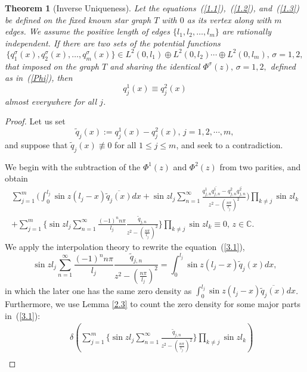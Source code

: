 \documentclass[10pt,a4paper]{article}
\theoremstyle{plain}
\newtheorem{theorem}{Theorem}[section]
\theoremstyle{definition}
\theoremstyle{remark}
\numberwithin{equation}{section}
\begin{document}
\begin{theorem}[Inverse Uniqueness]\label{T3.2}
Let the equations~(\ref{1.1}),~(\ref{1.2}), and~(\ref{1.3}) be defined on the fixed known star graph 
$T$ with $0$ as its vertex along with $m$ edges. We assume the positive length of edges $\{l_{1},l_{2},\ldots,l_{m}\}$ are rationally independent. If there are two sets of the potential functions $$\{q_{1}^{\sigma}(x),q_{2}^{\sigma}(x),\ldots,q_{m}^{\sigma}(x)\}\in L^{2}(0,l_{1})\oplus L^{2}(0,l_{2})\cdots\oplus L^{2}(0,l_{m}),\,\sigma=1,2,$$ that imposed on the graph $T$ and sharing the identical $\Phi^{\sigma}(z),\,\sigma=1,2,$ defined as in~(\ref{Phi}), then $$q_{j}^{1}(x)\equiv q_{j}^{2}(x)$$ almost everywhere for all $j$.
\end{theorem}
\begin{proof}
Let us set $$\widetilde{q}_{j}(x):=q_{j}^{1}(x)-q_{j}^{2}(x),\,j=1,2,\cdots,m,$$
and suppose that $\widetilde{q}_{j}(x)\not\equiv 0$ for all $1\leq j\leq m$, and seek to a contradiction.
\par %
We begin with the subtraction of the $\Phi^{1}(z)$ and $\Phi^{2}(z)$ from two parities, and obtain
\begin{eqnarray}\nonumber
\sum_{j=1}^{m}\Big(\int_{0}^{l_{j}}\sin{z(l_{j}-x)}\overline{\widetilde{q}_{j}(x)}dx+\sin{z l_{j}}\sum_{n=1}^{\infty}\frac{q^{1}_{j,n}\overline{q^{1}_{j,n}}-q^{2}_{j,n}\overline{q^{2}_{j,n}}}{z^{2}-(\frac{n\pi}{l_{j}})^{2}}\Big)\prod_{k\neq j}\sin{z l_{k}}\\
+\sum_{j=1}^{m}\Big\{\sin{z l_{j}}\sum_{n=1}^{\infty}\frac{(-1)^{n}n\pi}{l_{j}}\frac{\widetilde{q}_{j,n}}{z^{2}-(\frac{n\pi}{l_{j}})^{2}}\Big\}\prod_{k\neq j}\sin{z l_{k}}\equiv0,\,z\in\mathbb{C}.\label{3.1}
\end{eqnarray}
We apply the interpolation theory \cite[p.\,150,\,151]{Levin2} to rewrite the equation~(\ref{3.1}), 
\begin{equation}
\sin{z l_{j}}\sum_{n=1}^{\infty}\frac{(-1)^{n}n\pi}{l_{j}}\frac{\widetilde{q}_{j,n}}{z^{2}-(\frac{n\pi}{l_{j}})^{2}}=\int_{0}^{l_{j}}\sin{z(l_{j}-x)}\widetilde{q}_{j}(x)dx,
\end{equation}%
in which the later one has the same zero density as 
$\int_{0}^{l_{j}}\sin{z(l_{j}-x)}\overline{\widetilde{q}_{j}(x)}dx$.
Furthermore, we use Lemma \ref{2.3} to count the zero density for some major parts in~(\ref{3.1}):
\begin{eqnarray}\nonumber
&&\delta(\sum_{j=1}^{m}\Big\{\sin{z l_{j}}\sum_{n=1}^{\infty}\frac{\widetilde{q}_{j,n}}{z^{2}-(\frac{n\pi}{l_{j}})^{2}}\Big\}\prod_{k\neq j}\sin{z l_{k}})\\\nonumber

\end{eqnarray}
\end{proof}
\end{document}
